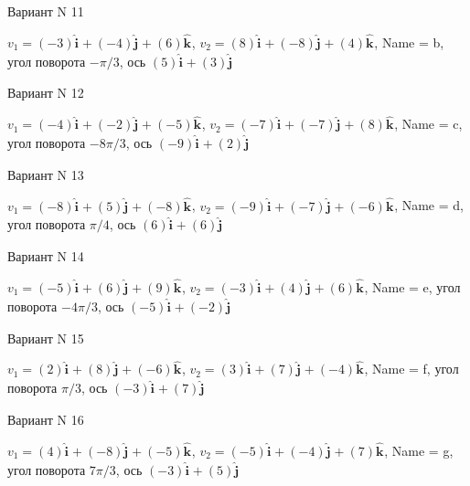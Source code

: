 \documentclass[11pt]{report}
\begin{document}
Вариант N 11

$v_1 = \left(-3\right)\mathbf{\hat{i}_{}} + \left(-4\right)\mathbf{\hat{j}_{}} + \left(6\right)\mathbf{\hat{k}_{}}$, $v_2 = \left(8\right)\mathbf{\hat{i}_{}} + \left(-8\right)\mathbf{\hat{j}_{}} + \left(4\right)\mathbf{\hat{k}_{}}$, Name = b, угол поворота $- \pi / 3$, ось $\left(5\right)\mathbf{\hat{i}_{}} + \left(3\right)\mathbf{\hat{j}_{}}$

Вариант N 12

$v_1 = \left(-4\right)\mathbf{\hat{i}_{}} + \left(-2\right)\mathbf{\hat{j}_{}} + \left(-5\right)\mathbf{\hat{k}_{}}$, $v_2 = \left(-7\right)\mathbf{\hat{i}_{}} + \left(-7\right)\mathbf{\hat{j}_{}} + \left(8\right)\mathbf{\hat{k}_{}}$, Name = c, угол поворота $- 8 \pi / 3$, ось $\left(-9\right)\mathbf{\hat{i}_{}} + \left(2\right)\mathbf{\hat{j}_{}}$

Вариант N 13

$v_1 = \left(-8\right)\mathbf{\hat{i}_{}} + \left(5\right)\mathbf{\hat{j}_{}} + \left(-8\right)\mathbf{\hat{k}_{}}$, $v_2 = \left(-9\right)\mathbf{\hat{i}_{}} + \left(-7\right)\mathbf{\hat{j}_{}} + \left(-6\right)\mathbf{\hat{k}_{}}$, Name = d, угол поворота $\pi / 4$, ось $\left(6\right)\mathbf{\hat{i}_{}} + \left(6\right)\mathbf{\hat{j}_{}}$

Вариант N 14

$v_1 = \left(-5\right)\mathbf{\hat{i}_{}} + \left(6\right)\mathbf{\hat{j}_{}} + \left(9\right)\mathbf{\hat{k}_{}}$, $v_2 = \left(-3\right)\mathbf{\hat{i}_{}} + \left(4\right)\mathbf{\hat{j}_{}} + \left(6\right)\mathbf{\hat{k}_{}}$, Name = e, угол поворота $- 4 \pi / 3$, ось $\left(-5\right)\mathbf{\hat{i}_{}} + \left(-2\right)\mathbf{\hat{j}_{}}$

Вариант N 15

$v_1 = \left(2\right)\mathbf{\hat{i}_{}} + \left(8\right)\mathbf{\hat{j}_{}} + \left(-6\right)\mathbf{\hat{k}_{}}$, $v_2 = \left(3\right)\mathbf{\hat{i}_{}} + \left(7\right)\mathbf{\hat{j}_{}} + \left(-4\right)\mathbf{\hat{k}_{}}$, Name = f, угол поворота $\pi / 3$, ось $\left(-3\right)\mathbf{\hat{i}_{}} + \left(7\right)\mathbf{\hat{j}_{}}$

Вариант N 16

$v_1 = \left(4\right)\mathbf{\hat{i}_{}} + \left(-8\right)\mathbf{\hat{j}_{}} + \left(-5\right)\mathbf{\hat{k}_{}}$, $v_2 = \left(-5\right)\mathbf{\hat{i}_{}} + \left(-4\right)\mathbf{\hat{j}_{}} + \left(7\right)\mathbf{\hat{k}_{}}$, Name = g, угол поворота $7 \pi / 3$, ось $\left(-3\right)\mathbf{\hat{i}_{}} + \left(5\right)\mathbf{\hat{j}_{}}$
\end{document}
